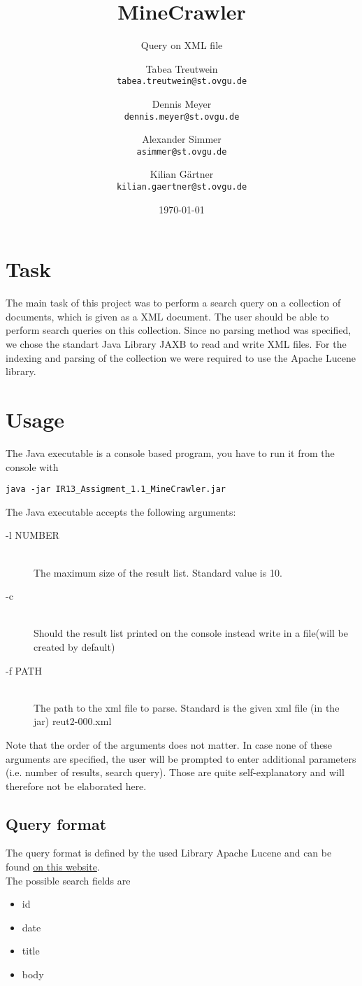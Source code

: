\documentclass{scrartcl}
\title{MineCrawler}
\subtitle{Query on XML file}
\author{
  Tabea Treutwein\\
  \texttt{tabea.treutwein@st.ovgu.de}\\
  \and
  Dennis Meyer\\
  \texttt{dennis.meyer@st.ovgu.de}\\
  \and
  Alexander Simmer\\
  \texttt{asimmer@st.ovgu.de}\\
  \and
  Kilian Gärtner\\
  \texttt{kilian.gaertner@st.ovgu.de}\\
}
\date{\today}
\begin{document}
\maketitle
 
\section{Task}
The main task of this project was to perform a search query on a collection of documents, which is given as a XML document. The user should be able to perform search queries on this collection.
Since no parsing method was specified, we chose the standart Java Library JAXB to read and write XML files. For the indexing and parsing of the collection we were required to use the Apache Lucene library.

\section{Usage}
The Java executable is a console based program, you have to run it from the console with
\begin{verbatim}
java -jar IR13_Assigment_1.1_MineCrawler.jar
\end{verbatim}
The Java executable accepts the following arguments:

\begin{description}
  \item[-l NUMBER] \hfill \\
  The maximum size of the result list. Standard value is 10.
  \item[-c] \hfill \\
  Should the result list printed on the console instead write in a file(will be created by default)
  \item[-f PATH] \hfill \\
  The path to the xml file to parse. Standard is the given xml file (in the jar) reut2-000.xml
\end{description}
Note that the order of the arguments does not matter. In case none of these arguments are specified, the user will be prompted to enter additional parameters (i.e. number of results, search query). Those are quite self-explanatory and will therefore not be elaborated here.

\subsection{Query format}
The query format is defined by the used Library Apache Lucene and can be found \href{http://lucene.apache.org/core/4_6_0/queryparser/org/apache/lucene/queryparser/classic/package-summary.html#package_description}{on this website}.  \\
The possible search fields are 
\begin{itemize}
	\item id
	\item date
	\item title
	\item body
\end{itemize}
\end{document}
